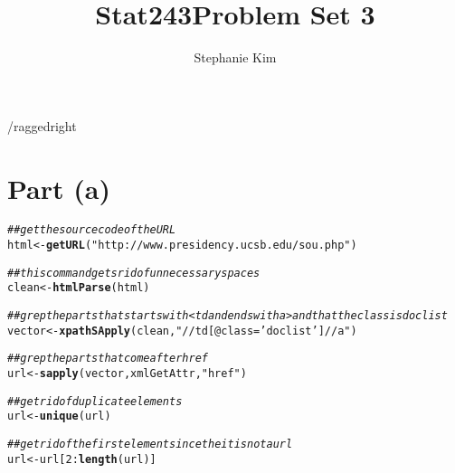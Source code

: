 \documentclass[english]{article}\usepackage[]{graphicx}\usepackage[]{color}
\makeatletter
\newcommand{\hlnum}[1]{\textcolor[rgb]{0.686,0.059,0.569}{#1}}%
\newcommand{\hlstr}[1]{\textcolor[rgb]{0.192,0.494,0.8}{#1}}%
\newcommand{\hlcom}[1]{\textcolor[rgb]{0.678,0.584,0.686}{\textit{#1}}}%
\newcommand{\hlopt}[1]{\textcolor[rgb]{0,0,0}{#1}}%
\newcommand{\hlstd}[1]{\textcolor[rgb]{0.345,0.345,0.345}{#1}}%
\newcommand{\hlkwb}[1]{\textcolor[rgb]{0.69,0.353,0.396}{#1}}%
\newcommand{\hlkwd}[1]{\textcolor[rgb]{0.737,0.353,0.396}{\textbf{#1}}}%
\newenvironment{kframe}{%
 \def\at@end@of@kframe{}%
 \ifinner\ifhmode%
  \def\at@end@of@kframe{\end{minipage}}%
  \begin{minipage}{\columnwidth}%
 \fi\fi%
 \def\FrameCommand##1{\hskip\@totalleftmargin \hskip-\fboxsep
 \colorbox{shadecolor}{##1}\hskip-\fboxsep
     \hskip-\linewidth \hskip-\@totalleftmargin \hskip\columnwidth}%
 \MakeFramed {\advance\hsize-\width
   \@totalleftmargin\z@ \linewidth\hsize
   \@setminipage}}%
 {\par\unskip\endMakeFramed%
 \at@end@of@kframe}
\newenvironment{knitrout}{}{} %
\makeatother
\begin{document}
\title{Stat243}


\title{Problem Set 3}


\author{Stephanie Kim}

\maketitle
/raggedright


\section*{Part (a)}

\begin{knitrout}
\color{fgcolor}\begin{kframe}
\begin{alltt}
\hlcom{## get the source code of the URL}
\hlstd{html}\hlkwb{<-}\hlkwd{getURL}\hlstd{(}\hlstr{"http://www.presidency.ucsb.edu/sou.php"}\hlstd{)}
\end{alltt}


{\ttfamily\noindent\bfseries{}}\begin{alltt}
\hlcom{## this command gets rid of unnecessary spaces }
\hlstd{clean}\hlkwb{<-}\hlkwd{htmlParse}\hlstd{(html)}
\end{alltt}


{\ttfamily\noindent\bfseries{}}\begin{alltt}
\hlcom{## grep the parts that starts with <td and ends with a> and that the class is doclist}
\hlstd{vector}\hlkwb{<-}\hlkwd{xpathSApply}\hlstd{(clean,}\hlstr{"//td[@class='doclist']//a"}\hlstd{)}
\end{alltt}


{\ttfamily\noindent\bfseries{}}\begin{alltt}
\hlcom{## grep the parts that come after href }
\hlstd{url}\hlkwb{<-}\hlkwd{sapply}\hlstd{(vector, xmlGetAttr,}\hlstr{"href"}\hlstd{)}
\end{alltt}


{\ttfamily\noindent\bfseries\color{errorcolor}{\#\# Error: object 'xmlGetAttr' not found}}\begin{alltt}
\hlcom{## get rid of duplicate elements }
\hlstd{url}\hlkwb{<-}\hlkwd{unique}\hlstd{(url)}
\end{alltt}


{\ttfamily\noindent\bfseries\color{errorcolor}{\#\# Error: unique() applies only to vectors}}\begin{alltt}
\hlcom{## get rid of the first element since the it is not a url }
\hlstd{url}\hlkwb{<-}\hlstd{url[}\hlnum{2}\hlopt{:}\hlkwd{length}\hlstd{(url)]}
\end{alltt}


{\ttfamily\noindent\bfseries\color{errorcolor}{\#\# Error: object of type 'closure' is not subsettable}}\end{kframe}
\end{knitrout}
\end{document}
